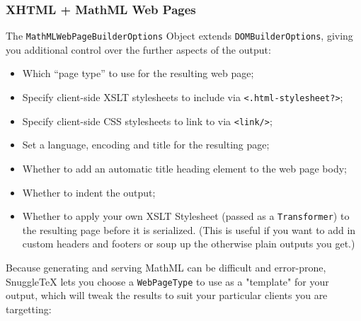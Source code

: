 \subsubsection*{XHTML + MathML Web Pages}

The \verb|MathMLWebPageBuilderOptions| Object extends \verb|DOMBuilderOptions|,
giving you additional control over the further aspects of the output:

\begin{itemize}
  \item Which ``page type'' to use for the resulting web page;
  \item Specify client-side XSLT stylesheets to include via \verb|<.html-stylesheet?>|;
  \item Specify client-side CSS stylesheets to link to via \verb|<link/>|;
  \item Set a language, encoding and title for the resulting page;
  \item Whether to add an automatic title heading element to the web page body;
  \item Whether to indent the output;
  \item Whether to apply your own XSLT Stylesheet (passed as a \verb|Transformer|) to
    the resulting page before it is serialized. (This is useful if you want to add
    in custom headers and footers or soup up the otherwise plain outputs you get.)
\end{itemize}

Because generating and serving MathML can be difficult and error-prone, SnuggleTeX lets
you choose a \verb|WebPageType| to use as a "template" for your output, which will tweak
the results to suit your particular clients you are targetting:

